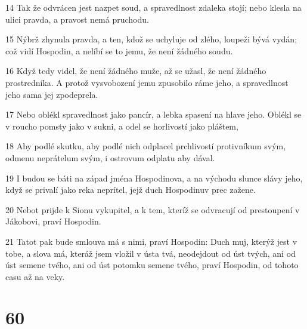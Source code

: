\par 14 Tak že odvrácen jest nazpet soud, a spravedlnost zdaleka stojí; nebo klesla na ulici pravda, a pravost nemá pruchodu.
\par 15 Nýbrž zhynula pravda, a ten, kdož se uchyluje od zlého, loupeži bývá vydán; což vidí Hospodin, a nelíbí se to jemu, že není žádného soudu.
\par 16 Když tedy videl, že není žádného muže, až se užasl, že není žádného prostredníka. A protož vysvobození jemu zpusobilo ráme jeho, a spravedlnost jeho sama jej zpodeprela.
\par 17 Nebo oblékl spravedlnost jako pancír, a lebka spasení na hlave jeho. Oblékl se v roucho pomsty jako v sukni, a odel se horlivostí jako pláštem,
\par 18 Aby podlé skutku, aby podlé nich odplacel prchlivostí protivníkum svým, odmenu neprátelum svým, i ostrovum odplatu aby dával.
\par 19 I budou se báti na západ jména Hospodinova, a na východu slunce slávy jeho, když se privalí jako reka neprítel, jejž duch Hospodinuv prec zažene.
\par 20 Nebot prijde k Sionu vykupitel, a k tem, kteríž se odvracují od prestoupení v Jákobovi, praví Hospodin.
\par 21 Tatot pak bude smlouva má s nimi, praví Hospodin: Duch muj, kterýž jest v tobe, a slova má, kteráž jsem vložil v ústa tvá, neodejdout od úst tvých, ani od úst semene tvého, ani od úst potomku semene tvého, praví Hospodin, od tohoto casu až na veky.

\chapter{60}

